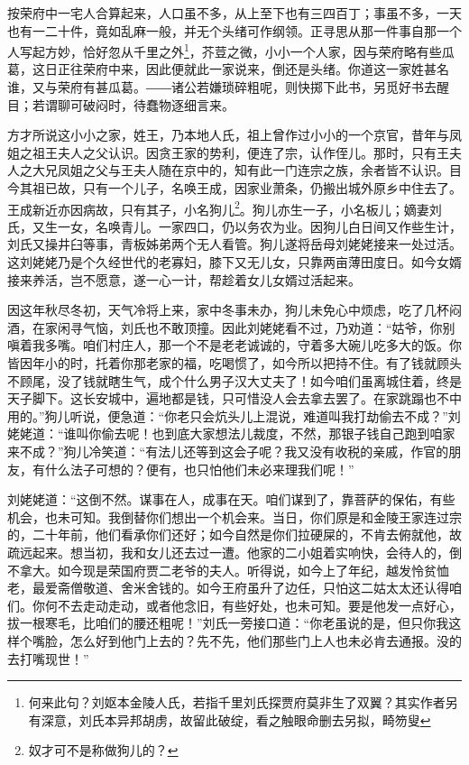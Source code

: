\documentclass[12pt,oneside]{book}
\begin{document}
按荣府中一宅人合算起来，人口虽不多，从上至下也有三四百丁；事虽不多，一天也有一二十件，竟如乱麻一般，并无个头绪可作纲领。正寻思从那一件事自那一个人写起方妙，恰好忽从千里之外\footnote{何来此句？刘妪本金陵人氏，若指千里刘氏探贾府莫非生了双翼？其实作者另有深意，刘氏本异邦胡虏，故留此破绽，看之触眼命删去另拟，畸笏叟}，芥荳之微，小小一个人家，因与荣府略有些瓜葛，这日正往荣府中来，因此便就此一家说来，倒还是头绪。你道这一家姓甚名谁，又与荣府有甚瓜葛。――诸公若嫌琐碎粗呢，则快掷下此书，另觅好书去醒目；若谓聊可破闷时，待蠢物逐细言来。

方才所说这小小之家，姓王，乃本地人氏，祖上曾作过小小的一个京官，昔年与凤姐之祖王夫人之父认识。因贪王家的势利，便连了宗，认作侄儿。那时，只有王夫人之大兄凤姐之父与王夫人随在京中的，知有此一门连宗之族，余者皆不认识。目今其祖已故，只有一个儿子，名唤王成，因家业萧条，仍搬出城外原乡中住去了。王成新近亦因病故，只有其子，小名狗儿\footnote{奴才可不是称做狗儿的？}。狗儿亦生一子，小名板儿；嫡妻刘氏，又生一女，名唤青儿。一家四口，仍以务农为业。因狗儿白日间又作些生计，刘氏又操井臼等事，青板姊弟两个无人看管。狗儿遂将岳母刘姥姥接来一处过活。这刘姥姥乃是个久经世代的老寡妇，膝下又无儿女，只靠两亩薄田度日。如今女婿接来养活，岂不愿意，遂一心一计，帮趁着女儿女婿过活起来。

因这年秋尽冬初，天气冷将上来，家中冬事未办，狗儿未免心中烦虑，吃了几杯闷酒，在家闲寻气恼，刘氏也不敢顶撞。因此刘姥姥看不过，乃劝道：“姑爷，你别嗔着我多嘴。咱们村庄人，那一个不是老老诚诚的，守着多大碗儿吃多大的饭。你皆因年小的时，托着你那老家的福，吃喝惯了，如今所以把持不住。有了钱就顾头不顾尾，没了钱就瞎生气，成个什么男子汉大丈夫了！如今咱们虽离城住着，终是天子脚下。这长安城中，遍地都是钱，只可惜没人会去拿去罢了。在家跳蹋也不中用的。”狗儿听说，便急道：“你老只会炕头儿上混说，难道叫我打劫偷去不成？”刘姥姥道：“谁叫你偷去呢！也到底大家想法儿裁度，不然，那银子钱自己跑到咱家来不成？”狗儿冷笑道：“有法儿还等到这会子呢？我又没有收税的亲戚，作官的朋友，有什么法子可想的？便有，也只怕他们未必来理我们呢！”

刘姥姥道：“这倒不然。谋事在人，成事在天。咱们谋到了，靠菩萨的保佑，有些机会，也未可知。我倒替你们想出一个机会来。当日，你们原是和金陵王家连过宗的，二十年前，他们看承你们还好；如今自然是你们拉硬屎的，不肯去俯就他，故疏远起来。想当初，我和女儿还去过一遭。他家的二小姐着实响快，会待人的，倒不拿大。如今现是荣国府贾二老爷的夫人。听得说，如今上了年纪，越发怜贫恤老，最爱斋僧敬道、舍米舍钱的。如今王府虽升了边任，只怕这二姑太太还认得咱们。你何不去走动走动，或者他念旧，有些好处，也未可知。要是他发一点好心，拔一根寒毛，比咱们的腰还粗呢！”刘氏一旁接口道：“你老虽说的是，但只你我这样个嘴脸，怎么好到他门上去的？先不先，他们那些门上人也未必肯去通报。没的去打嘴现世！”
\end{document}
